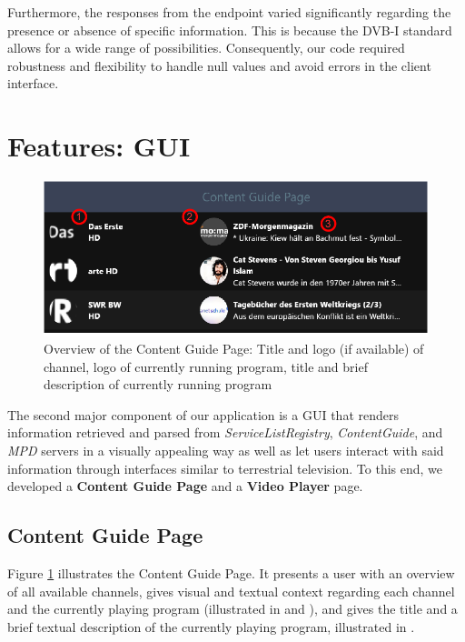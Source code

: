\documentclass[conference]{IEEEtran}
\begin{document}
Furthermore, the responses from the endpoint varied significantly regarding the presence or absence of specific information. This is because the DVB-I standard allows for a wide range of possibilities.
Consequently, our code required robustness and flexibility to handle null values and avoid errors in the client interface.


\section{Features: GUI}\label{dvbi_parser}
\begin{figure}[h]
	\centerline{\includegraphics[width=\linewidth]{figures/ContentGuidePage}}
	\caption{Overview of the Content Guide Page:  Title and logo (if available) of channel,  logo of currently running program,  title and brief description of currently running program}
	\label{fig:contentGuidePage}
\end{figure}

The second major component of our application is a GUI that renders information retrieved and parsed from \textit{ServiceListRegistry}, \textit{ContentGuide}, and \textit{MPD} servers in a visually appealing way as well as let users interact with said information through interfaces similar to terrestrial television. To this end, we developed a \textbf{Content Guide Page} and a \textbf{Video Player} page.

\subsection{Content Guide Page}
Figure \ref{fig:contentGuidePage} illustrates the Content Guide Page. It presents a user with an overview of all available channels, gives visual and textual context regarding each channel and the currently playing program (illustrated in  and ), and  gives the title and a brief textual description of the currently playing program, illustrated in . \\\par
\end{document}
